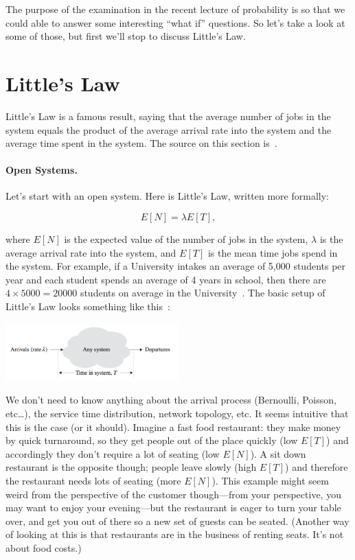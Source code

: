 




The purpose of the examination in the recent lecture of probability is so that we could able to answer some interesting ``what if'' questions. So let's take a look at some of those, but first we'll stop to discuss Little's Law.

\section*{Little's Law}
Little's Law is a famous result, saying that the average number of jobs in the system equals the product of the average arrival rate into the system and the average time spent in the system. The source on this section is~\cite{pmd}.

\paragraph{Open Systems.} Let's start with an open system. Here is Little's Law, written more formally:

\[
	E[N] = \lambda E[T],
\]

where $E[N]$ is the expected value of the number of jobs in the system, $\lambda$ is the average arrival rate into the system, and $E[T]$ is the mean time jobs spend in the system. For example, if a University intakes an average of 5,000 students per year and each student spends an average of 4 years in school, then there are $4 \times 5000=20000$ students on average in the University~\cite{sigman-little-law}. The basic setup of Little's Law looks something like this~\cite{pmd}:

\begin{center}
	\includegraphics[width=0.5\textwidth]{images/littleslaw.png}
\end{center}

We don't need to know anything about the arrival process (Bernoulli, Poisson, etc\ldots), the service time distribution, network topology, etc. It seems intuitive that this is the case (or it should). Imagine a fast food restaurant: they make money by quick turnaround, so they get people out of the place quickly (low $E[T]$) and accordingly they don't require a lot of seating (low $E[N]$). A sit down restaurant is the opposite though; people leave slowly (high $E[T]$) and therefore the restaurant needs lots of seating (more $E[N]$). This example might seem weird from the perspective of the customer though---from your perspective, you may want to enjoy your evening---but the restaurant is eager to turn your table over, and get you out of there so a new set of guests can be seated. (Another way of looking at this is that restaurants are in the business of renting seats. It's not about food costs.)


